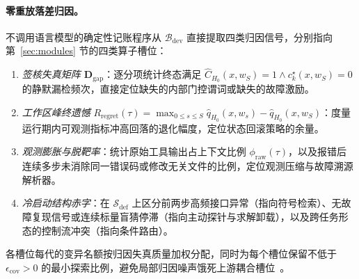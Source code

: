 \documentclass[UTF8,a4paper,10.5pt]{ctexart}
\begin{document}
\paragraph{零重放落差归因。}
不调用语言模型的确定性记账程序从 $\mathcal{B}_{\mathrm{dev}}$ 直接提取四类归因信号，分别指向第~\ref{sec:modules} 节的四类算子槽位：
\begin{enumerate}
  \item \emph{签核失真矩阵 $\mathbf{D}_{\mathrm{gap}}$}：逐分项统计终态满足 $\hat{C}_{H_0}(x,w_S)=1 \land c^\star_k(x,w_S)=0$ 的静默漏检频次，直接定位缺失的内部门控谓词或缺失的故障激励。
  \item \emph{工作区峰终遗憾} $R_{\mathrm{regret}}(\tau)=\max_{0\le s\le S}\hat{q}_{H_0}(x,w_s)-\hat{q}_{H_0}(x,w_S)$：度量运行期内可观测指标冲高回落的退化幅度，定位状态回滚策略的余量。
  \item \emph{观测膨胀与脱靶率}：统计原始工具输出占上下文比例 $\phi_{\mathrm{raw}}(\tau)$，以及报错后连续多步未消除同一错误码或修改无关文件的比例，定位观测压缩与故障溯源解析器。
  \item \emph{冷启动结构赤字}：在 $\mathcal{S}_{\mathrm{def}}$ 上区分前两步高频接口异常（指向符号检索）、无故障复现信号或连续标量盲猜停滞（指向主动探针与求解卸载），以及跨任务形态的控制流冲突（指向条件路由）。
\end{enumerate}
各槽位每代的变异名额按归因失真质量加权分配，同时为每个槽位保留不低于 $\epsilon_{\mathrm{cov}}>0$ 的最小探索比例，避免局部归因噪声饿死上游耦合槽位~\cite{harnessevo,coverage}。
\end{document}
